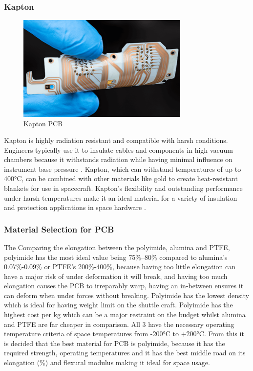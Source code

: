\subsubsection{Kapton}

\begin{figure}[htbp]
    \centering
    \includegraphics[width=8.5cm]{chapters/methodology/MaterialAnalysis/Fig5Kapton.png}
    \caption{Kapton PCB \cite{Goodfellow2025}}
    \label{fig:kapton-pcb}
\end{figure}

Kapton is highly radiation resistant and compatible with harsh conditions. 
Engineers typically use it to insulate cables and components in high vacuum chambers because it withstands radiation while having minimal influence on instrument base pressure \cite{MobilityEngineeringTech2024}. 
Kapton, which can withstand temperatures of up to 400°C, can be combined with other materials like gold to create heat-resistant blankets for use in spacecraft. 
Kapton's flexibility and outstanding performance under harsh temperatures make it an ideal material for a variety of insulation and protection applications in space hardware \cite{MobilityEngineeringTech2024}.


\subsubsection{Material Selection for PCB}
The Comparing the elongation between the polyimide, alumina and PTFE, polyimide has the most ideal value being 75\%--80\% compared to alumina's 0.07\%-0.09\% or PTFE's 200\%-400\%, because having too little elongation can have a major risk of under deformation it will break, and having too much elongation causes the PCB to irreparably warp, having an in-between ensures it can deform when under forces without breaking.
Polyimide has the lowest density which is ideal for having weight limit on the shuttle craft. 
Polyimide has the highest cost per kg which can be a major restraint on the budget whilst alumina and PTFE are far cheaper in comparison. 
All 3 have the necessary operating temperature criteria of space temperatures from -200°C to +200°C. 
From this it is decided that the best material for PCB is polyimide, because it has the required strength, operating temperatures and it has the best middle road on its elongation (\%) and flexural modulus making it ideal for space usage.

